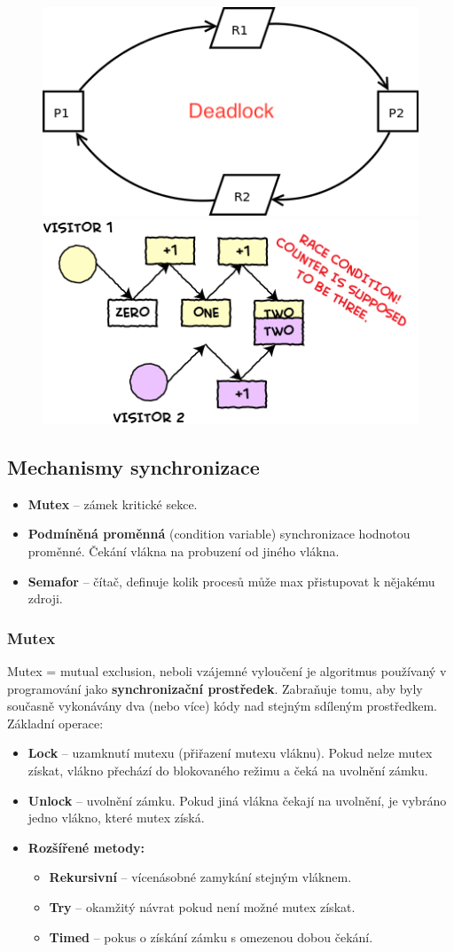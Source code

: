 \begin{figure}[H]
\centering
\includegraphics[width=.4\textwidth]{assets/deadlock.png}
\includegraphics[width=.4\textwidth]{assets/race_condition.png}
\end{figure}

\subsection{Mechanismy synchronizace}
\begin{itemize}
	\item \textbf{Mutex} -- zámek kritické sekce.
	\item \textbf{Podmíněná proměnná} (condition variable) synchronizace hodnotou proměnné. Čekání vlákna na probuzení od jiného vlákna.
	\item \textbf{Semafor} --  čítač, definuje kolik procesů může max přistupovat k nějakému zdroji.
\end{itemize}

\subsubsection{Mutex}
Mutex = mutual exclusion, neboli vzájemné vyloučení je algoritmus používaný v programování jako \textbf{synchronizační prostředek}. Zabraňuje tomu, aby byly současně vykonávány dva (nebo více) kódy nad stejným sdíleným prostředkem. Základní operace:
\begin{itemize}
	\item \textbf{Lock} -- uzamknutí mutexu (přiřazení mutexu vláknu). Pokud nelze mutex získat, vlákno přechází do blokovaného režimu a čeká na uvolnění zámku.
	\item \textbf{Unlock} -- uvolnění zámku. Pokud jiná vlákna čekají na uvolnění, je vybráno jedno vlákno, které mutex získá.
	\item \textbf{Rozšířené metody:}
	\begin{itemize}
		\item \textbf{Rekursivní} -- vícenásobné zamykání stejným vláknem.
		\item \textbf{Try} -- okamžitý návrat pokud není možné mutex získat.
		\item \textbf{Timed} -- pokus o získání zámku s omezenou dobou čekání.
	\end{itemize}
\end{itemize}

